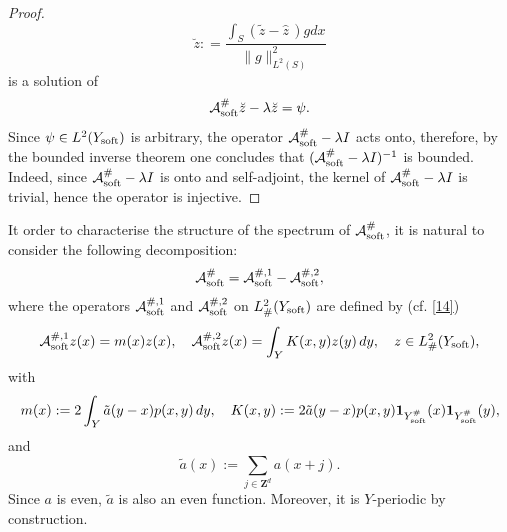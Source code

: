 \documentclass[11pt]{article}
\newcommand\soft{{\rm soft}}
\def\AA{\mathcal{A}}
\def\l{\lambda}
\theoremstyle{remark}
\begin{document}
\begin{proof}
\begin{equation*}
		\breve z: =  \frac{\int_S(\widetilde z-\hat{z}\,) {g}dx}{\|g\|^2_{L^2(S)}}
	\end{equation*}
	is a solution of
	\begin{equation*}%
		\AA_\soft^\#   \breve z -\lambda \breve z=\psi.
	\end{equation*}
	Since $\psi\in L^2(Y_\soft )$ is arbitrary, the operator $\AA_\soft^\#  - \l I$ acts onto, therefore, by the bounded inverse theorem one concludes that $(\AA_\soft^\# -\l I)^{-1}$ is bounded. Indeed, since   $\AA_\soft^\#  - \l I$ is onto and self-adjoint, the kernel of  $\AA_\soft^\#  - \l I$ is trivial, hence the operator is injective.
\end{proof} 	

It order to characterise the structure of the spectrum of $\AA_\soft^\#$, it is natural to consider the following decomposition:
\begin{equation}\label{operator2}
    \AA_\soft^\# =  \AA_\soft^{\#,1}- \AA_\soft^{\#,2},
\end{equation}
where the operators $\AA_\soft^{\#,1}$ and $\AA_\soft^{\#,2}$ on $L^2_\#(Y_\soft)$ are defined by (cf. \eqref{14})
 $$ \AA_\soft^{\#,1} z(x)=m(x) z(x), \quad \AA_\soft^{\#,2} z(x)=\int_{Y} K(x,y)z(y) \,dy, \quad z \in L^2_\#(Y_\soft), $$
  with
 \begin{equation} \label{andrey1}
 m(x):=2\int_{Y} \tilde{a}(y-x) p(x,y)\,d y, \quad K(x,y):=2 \tilde{a}(y-x)p(x,y)\mathbf{1}_{Y_\soft^{\#}}(x)\mathbf{1}_{Y_\soft^{\#}}(y),
 \end{equation}
 and
 \begin{equation} \label{andrei100}
 \tilde{a}(x):=\sum_{j \in \mathbf{Z}^d} a(x+j).
 \end{equation}
Since $a$ is even,  $\tilde{a}$ is also an even function. Moreover, it is $Y$-periodic by construction.
\end{document}
